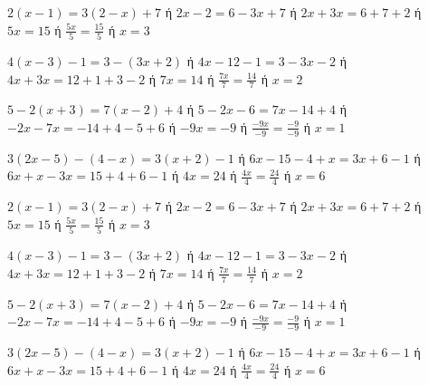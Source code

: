 \begin{alist}
\item $ 2(x-1)=3(2-x)+7 $ ή $ 2x-2=6-3x+7 $ ή $ 2x+3x=6+7+2 $ ή $ 5x=15 $ ή $ \frac{5x}{5}=\frac{15}{5} $ ή $ x=3 $
\item $ 4(x-3)-1=3-(3x+2) $ ή $ 4x-12-1=3-3x-2 $ ή $ 4x+3x=12+1+3-2 $ ή $ 7x=14 $ ή $ \frac{7x}{7}=\frac{14}{7} $ ή $ x=2 $
\item $ 5-2(x+3)=7(x-2)+4 $ ή $ 5-2x-6=7x-14+4 $ ή $ -2x-7x=-14+4-5+6 $ ή $ -9x=-9 $ ή $ \frac{-9x}{-9}=\frac{-9}{-9} $ ή $ x=1 $
\item $ 3(2x-5)-(4-x)=3(x+2)-1 $ ή $ 6x-15-4+x=3x+6-1 $ ή $ 6x+x-3x=15+4+6-1 $ ή $ 4x=24 $ ή $ \frac{4x}{4}=\frac{24}{4} $ ή $ x=6 $
\end{alist}
\begin{alist}
\item $ 2(x-1)=3(2-x)+7 $ ή $ 2x-2=6-3x+7 $ ή $ 2x+3x=6+7+2 $ ή $ 5x=15 $ ή $ \frac{5x}{5}=\frac{15}{5} $ ή $ x=3 $
\item $ 4(x-3)-1=3-(3x+2) $ ή $ 4x-12-1=3-3x-2 $ ή $ 4x+3x=12+1+3-2 $ ή $ 7x=14 $ ή $ \frac{7x}{7}=\frac{14}{7} $ ή $ x=2 $
\item $ 5-2(x+3)=7(x-2)+4 $ ή $ 5-2x-6=7x-14+4 $ ή $ -2x-7x=-14+4-5+6 $ ή $ -9x=-9 $ ή $ \frac{-9x}{-9}=\frac{-9}{-9} $ ή $ x=1 $
\item $ 3(2x-5)-(4-x)=3(x+2)-1 $ ή $ 6x-15-4+x=3x+6-1 $ ή $ 6x+x-3x=15+4+6-1 $ ή $ 4x=24 $ ή $ \frac{4x}{4}=\frac{24}{4} $ ή $ x=6 $
\end{alist}
